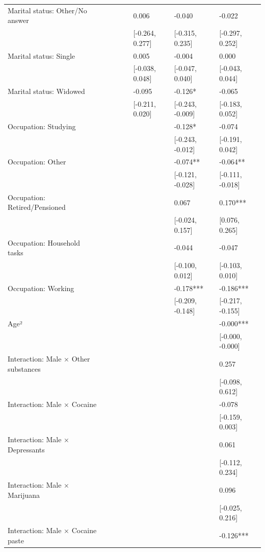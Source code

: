 \documentclass[
  spanish,
  10pt,
]{article}
\begin{document}
\begin{table}[H]
{\begin{tabular}[t]{llllllll}
Marital status: Other/No answer &  &  &  &  & 0.006 & -0.040 & -0.022\\
 &  &  &  &  & {}[-0.264, 0.277] & {}[-0.315, 0.235] & {}[-0.297, 0.252]\\
Marital status: Single &  &  &  &  & 0.005 & -0.004 & 0.000\\
 &  &  &  &  & {}[-0.038, 0.048] & {}[-0.047, 0.040] & {}[-0.043, 0.044]\\
Marital status: Widowed &  &  &  &  & -0.095 & -0.126* & -0.065\\
 &  &  &  &  & {}[-0.211, 0.020] & {}[-0.243, -0.009] & {}[-0.183, 0.052]\\
Occupation: Studying &  &  &  &  &  & -0.128* & -0.074\\
 &  &  &  &  &  & {}[-0.243, -0.012] & {}[-0.191, 0.042]\\
Occupation: Other &  &  &  &  &  & -0.074** & -0.064**\\
 &  &  &  &  &  & {}[-0.121, -0.028] & {}[-0.111, -0.018]\\
Occupation: Retired/Pensioned &  &  &  &  &  & 0.067 & 0.170***\\
 &  &  &  &  &  & {}[-0.024, 0.157] & {}[0.076, 0.265]\\
Occupation: Household tasks &  &  &  &  &  & -0.044 & -0.047\\
 &  &  &  &  &  & {}[-0.100, 0.012] & {}[-0.103, 0.010]\\
Occupation: Working &  &  &  &  &  & -0.178*** & -0.186***\\
 &  &  &  &  &  & {}[-0.209, -0.148] & {}[-0.217, -0.155]\\
Age² &  &  &  &  &  &  & -0.000***\\
 &  &  &  &  &  &  & {}[-0.000, -0.000]\\
Interaction: Male × Other substances &  &  &  &  &  &  & 0.257\\
 &  &  &  &  &  &  & {}[-0.098, 0.612]\\
Interaction: Male × Cocaine &  &  &  &  &  &  & -0.078\\
 &  &  &  &  &  &  & {}[-0.159, 0.003]\\
Interaction: Male × Depressants &  &  &  &  &  &  & 0.061\\
 &  &  &  &  &  &  & {}[-0.112, 0.234]\\
Interaction: Male × Marijuana &  &  &  &  &  &  & 0.096\\
 &  &  &  &  &  &  & {}[-0.025, 0.216]\\
Interaction: Male × Cocaine paste &  &  &  &  &  &  & -0.126***\\

\end{tabular}}
\end{table}
\end{document}
